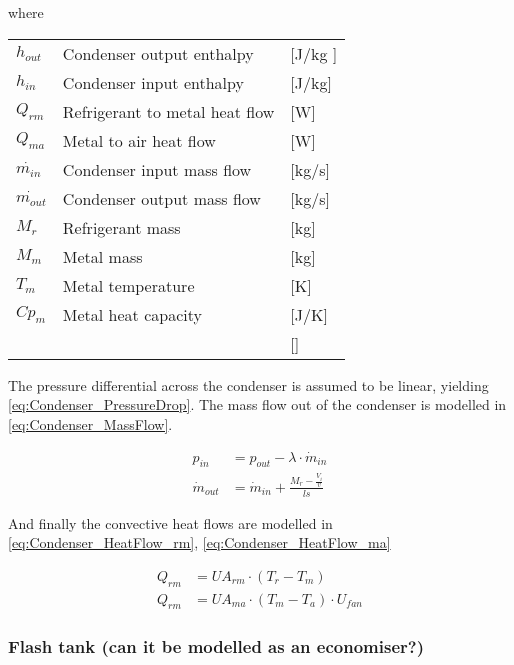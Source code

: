 where 

\begin{center}
	\begin{tabular}{l p{8cm} l}
		$h_{out}$				&  Condenser output enthalpy			& [\si{J}/\si{kg} ]\\
		$h_{in}$					&  Condenser input enthalpy 			& [\si{J}/\si{kg}] \\
		$Q_{rm}$					& Refrigerant to metal heat flow 			& [\si{W}] \\
		$Q_{ma}$					& Metal to air heat flow						& [\si{W}] \\
		$\dot{m_{in}}$			& Condenser input mass flow 			& [\si{kg}/\si{s}] \\
		$\dot{m_{out}}$			& Condenser output mass flow 		& [\si{kg}/\si{s}] \\
		$M_r$						& Refrigerant mass 								& [\si{kg}] \\
		$M_m$						& Metal mass												& [\si{kg}] \\
		$T_m$						& Metal temperature 							& [\si{K}]\\
		$Cp_m$					& Metal heat capacity 						& [\si{J}/\si{K}]\\
		$$				&  			& []

	\end{tabular}
\end{center}

The pressure differential across the condenser is assumed to be linear, yielding \cref{eq:Condenser_PressureDrop}.
The mass flow out of the condenser is modelled in \cref{eq:Condenser_MassFlow}.


\begin{align}
	p_{in}	 			& = p_{out} - \lambda \cdot \dot{m}_{in}  				\label{eq:Condenser_PressureDrop}\\
	\dot{m}_{out}		& = \dot{m}_{in} + \frac{M_r - \frac{V_i}{v}}{ls}		\label{eq:Condenser_MassFlow}
\end{align}

And finally the convective heat flows are modelled in \cref{eq:Condenser_HeatFlow_rm}, \cref{eq:Condenser_HeatFlow_ma}

\begin{align}
	Q_{rm}	 			& = U A_{rm} \cdot (T_r - T_m)							\label{eq:Condenser_HeatFlow_rm}\\
	Q_{rm}	 			& = U A_{ma} \cdot (T_m - T_a)\cdot U_{fan}				\label{eq:Condenser_HeatFlow_ma}
\end{align}	

\subsubsection{Flash tank (can it be modelled as an economiser?)}

